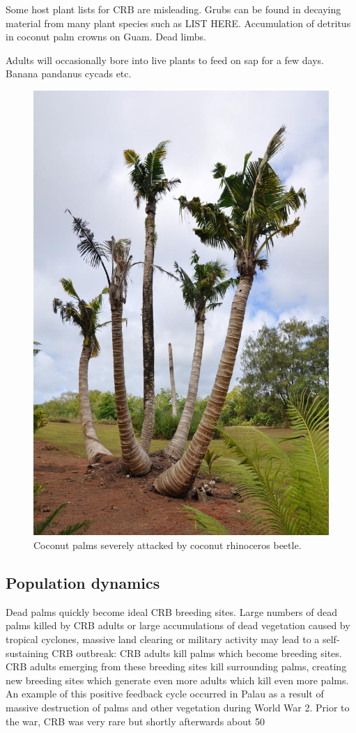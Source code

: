 \documentclass[twocolumn,letterpaper]{scrartcl}
\begin{document}
Some host plant lists for CRB are misleading. Grubs can be found in decaying material from many plant species such as LIST HERE. Accumulation of detritus in coconut palm crowns on Guam. Dead limbs.

Adults will occasionally bore into live plants to feed on sap for a few days. Banana pandanus cycads etc.

\begin{figure}[h]
	\centering
	\includegraphics[width=0.8\linewidth]{images/dying_coconuts}
	\caption{Coconut palms severely attacked by coconut rhinoceros beetle.}
	\label{fig:dyingcoconuts}
\end{figure}

\subsection{Population dynamics}
Dead palms quickly become ideal CRB breeding sites. Large numbers of dead palms killed by CRB adults or  large accumulations of dead vegetation caused by tropical cyclones, massive land clearing or military activity may lead to a self-sustaining  CRB outbreak: CRB adults kill palms which become breeding sites. CRB adults emerging from these breeding sites kill surrounding palms, creating new breeding sites which generate even more adults which kill even more palms. An example of this positive feedback cycle occurred in Palau as a result of massive destruction of palms and other vegetation during World War 2. Prior to the war, CRB was very rare but shortly afterwards about 50%
\end{document}
